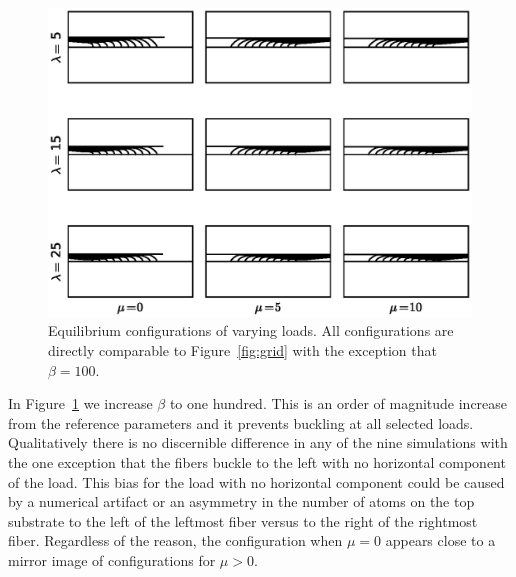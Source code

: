 	\begin{figure}
		\begin{center}
			\includegraphics[scale=1]{./fig/ch4/grid_b100.eps}
		\end{center}		
		\caption{Equilibrium configurations of varying loads. All configurations are directly comparable to Figure~\ref{fig:grid} with the exception that $\beta = 100$.
		\label{fig:grid_b100}}
	\end{figure}

	In Figure~\ref{fig:grid_b100} we increase $\beta$ to one hundred. This is an order of magnitude increase from the reference parameters and it prevents buckling at all selected loads. Qualitatively there is no discernible difference in any of the nine simulations with the one exception that the fibers buckle to the left with no horizontal component of the load. This bias for the load with no horizontal component could be caused by a numerical artifact or an asymmetry in the number of atoms on the top substrate to the left of the leftmost fiber versus to the right of the rightmost fiber. Regardless of the reason, the configuration when $\mu = 0$ appears close to a mirror image of configurations for $\mu > 0$.
	
